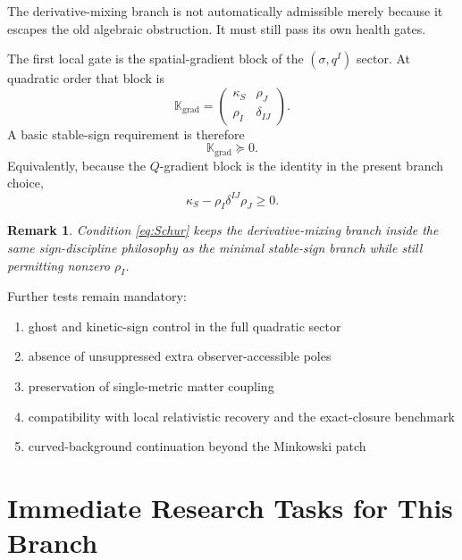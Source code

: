 \documentclass[11pt]{article}
\newtheorem{remark}{Remark}
\begin{document}
The derivative-mixing branch is not automatically admissible merely because it escapes the old algebraic obstruction. It must still pass its own health gates.

The first local gate is the spatial-gradient block of the \((\sigma,q^I)\) sector. At quadratic order that block is
\begin{equation}
\mathbb K_{\mathrm{grad}}
=
\begin{pmatrix}
\kappa_S & \rho_J \\
\rho_I & \delta_{IJ}
\end{pmatrix}.
\label{eq:Kgrad}
\end{equation}
A basic stable-sign requirement is therefore
\begin{equation}
\mathbb K_{\mathrm{grad}} \succeq 0.
\label{eq:Kpositive}
\end{equation}
Equivalently, because the \(Q\)-gradient block is the identity in the present branch choice,
\begin{equation}
\kappa_S-\rho_I\delta^{IJ}\rho_J \ge 0.
\label{eq:Schur}
\end{equation}

\begin{remark}
Condition \eqref{eq:Schur} keeps the derivative-mixing branch inside the same sign-discipline philosophy as the minimal stable-sign branch while still permitting nonzero \(\rho_I\).
\end{remark}

Further tests remain mandatory:
\begin{enumerate}
    \item ghost and kinetic-sign control in the full quadratic sector
    \item absence of unsuppressed extra observer-accessible poles
    \item preservation of single-metric matter coupling
    \item compatibility with local relativistic recovery and the exact-closure benchmark
    \item curved-background continuation beyond the Minkowski patch
\end{enumerate}

\section{Immediate Research Tasks for This Branch}
\end{document}
